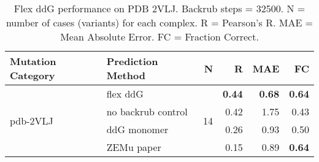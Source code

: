 \begin{table}
  \begin{tabular}{llrrrr}
\toprule
Mutation Category &   Prediction Method &   N &    R &  MAE &   FC \\
\midrule
 \multirow{ 4}{*}{pdb-2VLJ} & flex ddG & \multirow{ 4}{*}{14} & \textbf{0.44} & \textbf{0.68} & \textbf{0.64}  \\
 & no backrub control & & 0.42 & 1.75 & 0.43  \\
 & ddG monomer & & 0.26 & 0.93 & 0.50  \\
 & ZEMu paper & & 0.15 & 0.89 & \textbf{0.64}  \\
\bottomrule
\end{tabular}
  \caption[Flex ddG performance on PDB 2VLJ]{
    Flex ddG performance on PDB 2VLJ. Backrub steps = 32500. N = number of cases (variants) for each complex. R = Pearson's R. MAE = Mean Absolute Error. FC = Fraction Correct.
  } \label{tab:table-pdb-2VLJ}
\end{table}
